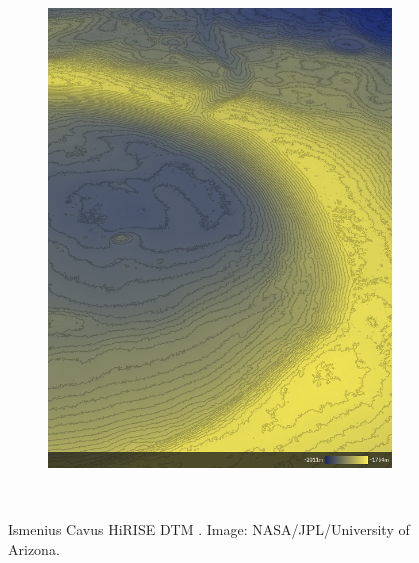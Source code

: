\begin{figure}[h]
\begin{subfigure}[t]{\subfigureWidth}
        \label{fig:sub:ismenius-cavus-dtm}
    \end{subfigure}\hfill
    \begin{subfigure}[t]{\subfigureWidth}
        \centering
        \includegraphics[height=\graphicsHeight]{sections/mars-solar-energy/mission-sites/images/ismenius-cavus-dtm-altimetry.png}
		\label{fig:sub:ismenius-cavus-dtm-altimetry}
	\end{subfigure}\\[0.8ex]
    \caption[Ismenius Cavus HiRISE digital terrain model]
            {Ismenius Cavus \ac{HiRISE} \ac{DTM} . Image: \ac{NASA}/\ac{JPL}/University of Arizona.}
    \label{fig:ismenius-cavus}
\vspace{-2ex}
\end{figure}

